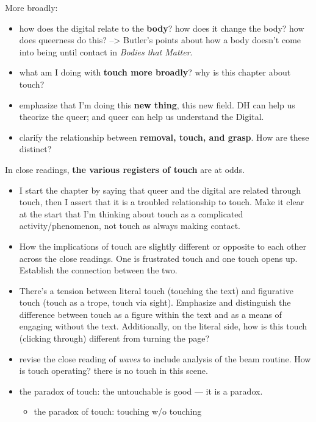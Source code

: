 \documentclass[11pt]{article}
\begin{document}
\begin{enumerate}
More broadly: 
\begin{itemize}
\item how does the digital relate to the \textbf{\textbf{body}}? how does it change the
body? how does queerness do this? --> Butler's points about how a
body doesn't come into being until contact in \emph{Bodies that Matter}.
\item what am I doing with \textbf{\textbf{touch more broadly}}? why is this chapter
about touch?
\item emphasize that I'm doing this \textbf{\textbf{new thing}}, this new field. DH can
help us theorize the queer; and queer can help us understand the
Digital.
\item clarify the relationship between \textbf{\textbf{removal, touch, and grasp}}. How
are these distinct?
\end{itemize}

In close readings, \textbf{\textbf{the various registers of touch}} are at odds.  
\begin{itemize}
\item I start the chapter by saying that queer and the digital are related
through touch, then I assert that it is a troubled relationship to
touch. Make it clear at the start that I'm thinking about touch as a
complicated activity/phenomenon, not touch as always making
contact.
\item How the implications of touch are slightly different or opposite to
each other across the close readings. One is frustrated touch and
one touch opens up. Establish the connection between the two.
\item There's a tension between literal touch (touching the text) and
figurative touch (touch as a trope, touch via sight). Emphasize and
distinguish the difference between touch as a figure within the text
and as a means of engaging without the text. Additionally, on the
literal side, how is this touch (clicking through) different from
turning the page?
\item revise the close reading of \emph{waves} to include analysis of the beam
routine. How is touch operating? there is no touch in this scene.
\item the paradox of touch: the untouchable is good --- it is a paradox. 
\begin{itemize}
\item the paradox of touch: touching w/o touching
\end{itemize}
\end{itemize}


\end{enumerate}
\end{document}
